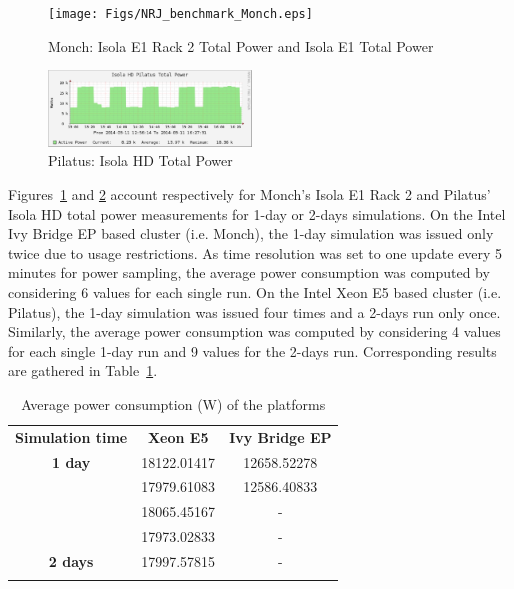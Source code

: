 \begin{figure}[htbf]
  \begin{center}
    \texttt{[image: Figs/NRJ\_benchmark\_Monch.eps]}
    \caption{Monch: Isola E1 Rack 2 Total Power and Isola E1 Total
      Power}
    \label{fig:1}
  \end{center}
\end{figure}

\begin{figure}[htbf]
  \begin{center}
    \includegraphics[width=0.48\textwidth]{Figs/NRJ_benchmark_Pilatus.eps}
    \caption{Pilatus: Isola HD Total Power}
    \label{fig:2}
  \end{center}
\end{figure}

Figures~\ref{fig:1} and  \ref{fig:2} account respectively  for Monch's
Isola E1  Rack 2  and Pilatus' Isola  HD total power  measurements for
1-day or 2-days simulations. On  the Intel Ivy Bridge EP based cluster
(i.e. Monch), the 1-day simulation  was issued only twice due to usage
restrictions. As time resolution was set to one update every 5 minutes
for  power sampling,  the average  power consumption  was  computed by
considering 6 values for each single  run.  On the Intel Xeon E5 based
cluster (i.e.   Pilatus), the 1-day  simulation was issued  four times
and a 2-days  run only once. Similarly, the  average power consumption
was computed by  considering 4 values for each single  1-day run and 9
values  for the  2-days  run. Corresponding  results  are gathered  in
Table~\ref{tab:3}.

\begin{table}[htbf]
  \begin{center}
    \caption{Average power consumption (W) of the platforms}
    \label{tab:3}
    \begin{tabular}{ccc}
      \hline\noalign{\smallskip}
      \textbf{Simulation time} & \textbf{Xeon E5} & \textbf{Ivy Bridge EP} \\
      \noalign{\smallskip}\hline\noalign{\smallskip}
      \textbf{1 day} & 18122.01417 & 12658.52278 \\ 
      & 17979.61083 & 12586.40833 \\
      & 18065.45167 & - \\
      & 17973.02833 & - \\
      \noalign{\smallskip}\hline\noalign{\smallskip}
      \textbf{2 days} & 17997.57815 & - \\
      \noalign{\smallskip}\hline
    \end{tabular}
  \end{center}
\end{table}

